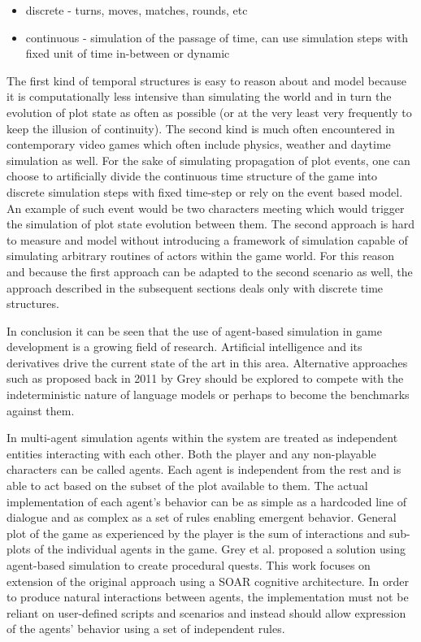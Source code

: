 \begin{itemize}
    \item discrete - turns, moves, matches, rounds, etc
    \item continuous - simulation of the passage of time, can use simulation steps with fixed unit of time in-between or dynamic
\end{itemize}

The first kind of temporal structures is easy to reason about and model because it is computationally less intensive than simulating the world and in turn the evolution of plot state as often as possible (or at the very least very frequently to keep the illusion of continuity).
The second kind is much often encountered in contemporary video games which often include physics, weather and daytime simulation as well.
For the sake of simulating propagation of plot events, one can choose to artificially divide the continuous time structure of the game into discrete simulation steps with fixed time-step or rely on the event based model.
An example of such event would be two characters meeting which would trigger the simulation of plot state evolution between them.
The second approach is hard to measure and model without introducing a framework of simulation capable of simulating arbitrary routines of actors within the game world.
For this reason and because the first approach can be adapted to the second scenario as well, the approach described in the subsequent sections deals only with discrete time structures.

In conclusion it can be seen that the use of agent-based simulation in game development is a growing field of research.
Artificial intelligence and its derivatives drive the current state of the art in this area.
Alternative approaches such as proposed back in 2011 by Grey\cite{grey2011procedural} should be explored to compete with the indeterministic nature of language models or perhaps to become the benchmarks against them.

In multi-agent simulation agents within the system are treated as independent entities interacting with each other.
Both the player and any non-playable characters can be called agents.
Each agent is independent from the rest and is able to act based on the subset of the plot available to them.
The actual implementation of each agent's behavior can be as simple as a hardcoded line of dialogue and as complex as a set of rules enabling emergent behavior.
General plot of the game as experienced by the player is the sum of interactions and sub-plots of the individual agents in the game.
Grey et al.\cite{grey2011procedural} proposed a solution using agent-based simulation to create procedural quests.
This work focuses on extension of the original approach using a SOAR cognitive architecture\cite{rosenbloom1993soar}.
In order to produce natural interactions between agents, the implementation must not be reliant on user-defined scripts and scenarios and instead should allow expression of the agents' behavior using a set of independent rules.

